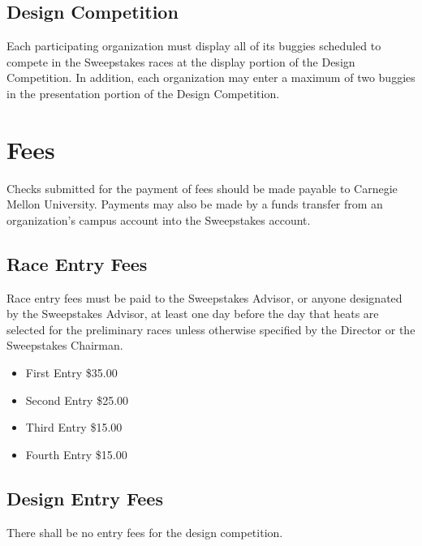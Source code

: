 \subsection{Design Competition}

	Each participating organization must display all of its buggies scheduled to
	compete in the Sweepstakes races at the display portion of the Design
	Competition. In addition, each organization may enter a maximum of two buggies
	in the presentation portion of the Design Competition.

\section{Fees}

	Checks submitted for the payment of fees should be made payable to Carnegie
	Mellon University. Payments may also be made by a funds transfer from an
	organization's campus account into the Sweepstakes account.

\subsection{Race Entry Fees}

	Race entry fees must be paid to the Sweepstakes Advisor, or anyone designated
	by the Sweepstakes Advisor, at least one day before the day that heats are
	selected for the preliminary races unless otherwise specified by the Director
	or the Sweepstakes Chairman.

	\begin{itemize}
		\item First Entry \$35.00
		\item Second Entry \$25.00
		\item Third Entry \$15.00
		\item Fourth Entry \$15.00
	\end{itemize}

\subsection{Design Entry Fees}

	There shall be no entry fees for the design competition.


